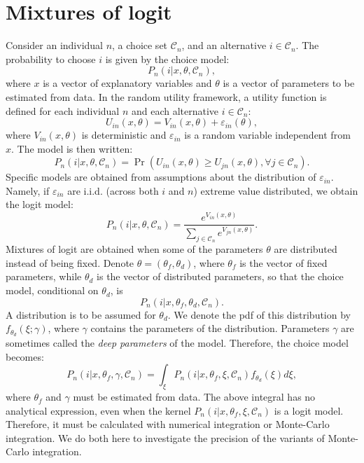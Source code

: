 \documentclass[12pt,a4paper]{article}
\newcommand{\C}{\mathcal{C}}
\newcommand{\prob}{\operatorname{Pr}}
\begin{document}
\section{Mixtures of logit}

Consider an
individual $n$, a choice set $\C_n$, and an alternative $i\in\C_n$. The
probability to choose $i$ is given by the choice model:
\begin{equation}
P_n(i|x,\theta,\C_n), 
\end{equation}
where $x$ is a vector of explanatory variables and $\theta$ is a vector
of parameters to be estimated from data. In the random utility framework,
a utility function is defined for each individual $n$ and each
alternative $i\in\C_n$:
\begin{equation}
U_{in}(x,\theta)= V_{in}(x,\theta) + \varepsilon_{in}(\theta),
\end{equation}
where $V_{in}(x,\theta)$ is deterministic and $\varepsilon_{in}$ is a
random variable independent from $x$. The model is then written:
\begin{equation}
P_n(i|x,\theta,\C_n) = \prob(U_{in}(x,\theta) \geq U_{jn}(x,\theta), \forall j \in \C_n).
\end{equation}
Specific models are obtained from assumptions about the distribution
of $\varepsilon_{in}$. Namely, if $\varepsilon_{in}$ are
i.i.d. (across both $i$ and $n$) extreme value distributed, we obtain
the logit model: 
\begin{equation}
P_n(i|x,\theta,\C_n) = \frac{e^{V_{in}(x,\theta)}}{\sum_{j\in\C_n}e^{V_{jn}(x,\theta)}}.
\end{equation}
Mixtures of logit are obtained when some of the parameters $\theta$
are distributed instead of being fixed. Denote
$\theta=(\theta_f,\theta_d)$, where $\theta_f$ is the vector of fixed
parameters, while $\theta_d$ is the vector of distributed parameters,
so that the choice model, conditional on $\theta_d$, is 
\begin{equation}
P_n(i|x,\theta_f,\theta_d,\C_n).
\end{equation}
A distribution is to be assumed for $\theta_d$. We denote the pdf of
this distribution by $f_{\theta_d}(\xi;\gamma)$, where $\gamma$ contains the
parameters of the distribution. Parameters $\gamma$ are sometimes
called the \emph{deep parameters} of the model. Therefore, the choice model becomes:
\begin{equation}
\label{eq:mixedLogit}
P_n(i|x,\theta_f,\gamma,\C_n) = \int_\xi P_n(i|x,\theta_f,\xi,\C_n) f_{\theta_d}(\xi)d\xi,
\end{equation}
where $\theta_f$ and $\gamma$ must be estimated from data.
The above integral has no analytical expression, even when the kernel
$P_n(i|x,\theta_f,\xi,\C_n)$ is a logit model. Therefore, it must be
calculated with numerical integration or Monte-Carlo integration. We
do both here to investigate the precision of the variants of
Monte-Carlo integration.  
\end{document}
